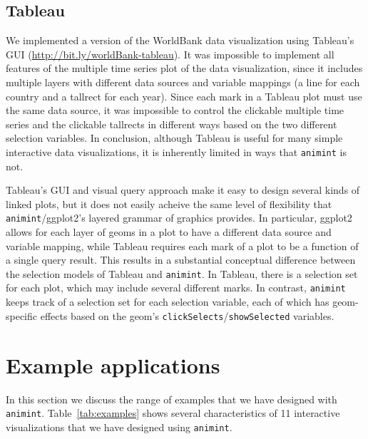 \documentclass[journal]{vgtc}\usepackage[]{graphicx}\usepackage[]{color}
\begin{document}
\subsection{Tableau}

We implemented a version of the WorldBank data visualization using
Tableau's GUI (\url{http://bit.ly/worldBank-tableau}).
It was impossible to implement all features of the multiple time
series plot of the data visualization, since it includes multiple
layers with different data sources and variable mappings (a line for
each country and a tallrect for each year). Since each mark in a
Tableau plot must use the same data source, it was impossible to
control the clickable multiple time series and the clickable tallrects
in different ways based on the two different selection variables. In
conclusion, although Tableau is useful for many simple interactive
data visualizations, it is inherently limited in ways that
\texttt{animint} is not.

Tableau's GUI and visual query approach
make it easy to design several kinds of linked plots, but it does not
easily acheive the same level of flexibility that \texttt{animint}/ggplot2's
layered grammar of graphics provides. In particular, ggplot2 allows
for each layer of geoms in a plot to have a different data source and
variable mapping, while Tableau requires each mark of a plot to be a
function of a single query result. This results in a substantial
conceptual difference between the selection models of Tableau and
\texttt{animint}. In Tableau, there is a selection set for each plot, which may
include several different marks. In contrast, \texttt{animint} keeps track of a
selection set for each selection variable, each of which has
geom-specific effects based on the geom's \texttt{clickSelects}/\texttt{showSelected}
variables.


\section{Example applications}

In this section we discuss the range of examples that we have designed
with \texttt{animint}. Table~\ref{tab:examples} shows several characteristics
of 11 interactive visualizations that we have designed using
\texttt{animint}.
\end{document}
